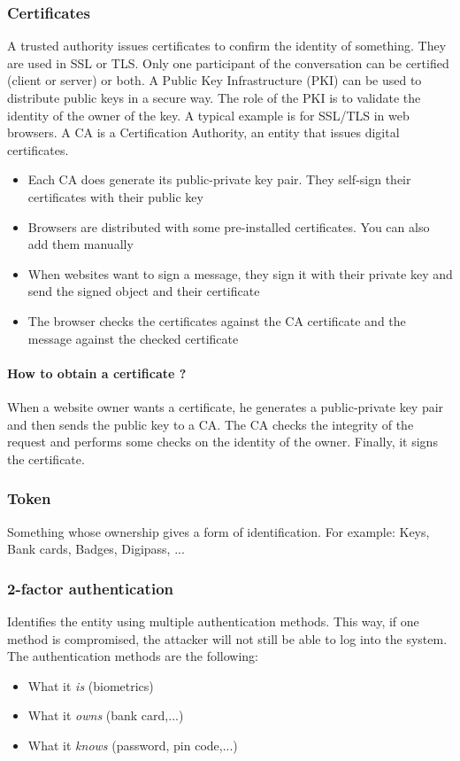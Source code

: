 \subsubsection{Certificates}
A trusted authority issues certificates to confirm the identity of something.
They are used in SSL or TLS.
Only one participant of the conversation can be certified (client or server)
or both.
A Public Key Infrastructure (PKI) can be used to distribute public keys in a
secure way. The role of the PKI is to validate the identity of the owner of
the key.
A typical example is for SSL/TLS in web browsers. A CA is a Certification
Authority, an entity that issues digital certificates.
\begin{itemize}
\item Each CA does generate its public-private key pair. They self-sign their
certificates with their public key
\item Browsers are distributed with some pre-installed certificates. You can
also add them manually
\item When websites want to sign a message, they sign it with their private
key and send the signed object and their certificate
\item The browser checks the certificates against the CA certificate and the
message against the checked certificate
\end{itemize}

\paragraph{How to obtain a certificate ?}
When a website owner wants a certificate, he generates a public-private key
pair and then sends the public key to a CA.
The CA checks the integrity of the request and performs some checks on the
identity of the owner. Finally, it signs the certificate.

\subsubsection{Token}
Something whose ownership gives a form of identification.
For example: Keys, Bank cards, Badges, Digipass, ...

\subsubsection{2-factor authentication}
Identifies the entity using multiple authentication methods.
This way, if one method is compromised, the attacker will not still be able to
log into the system.
The authentication methods are the following:
\begin{itemize}
\item What it \emph{is} (biometrics)
\item What it \emph{owns} (bank card,...)
\item What it \emph{knows} (password, pin code,...)
\end{itemize}

